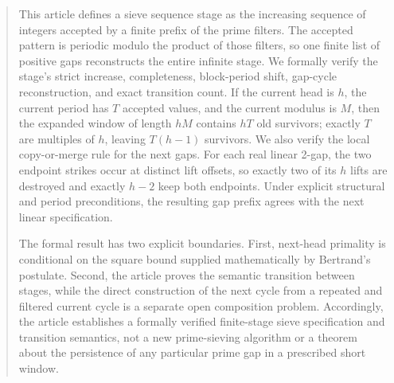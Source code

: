 \begin{abstract}
This article defines a sieve sequence stage as the increasing sequence of
integers accepted by a finite prefix of the prime filters. The accepted
pattern is periodic modulo the product of those filters, so one finite
list of positive gaps reconstructs the entire infinite stage. We formally
verify the stage's strict increase, completeness, block-period shift,
gap-cycle reconstruction, and exact transition count. If the current head
is $h$, the current period has $T$ accepted values, and the current
modulus is $M$, then the expanded window of length $hM$ contains $hT$ old
survivors; exactly $T$ are multiples of $h$, leaving $T(h-1)$ survivors.
We also verify the local copy-or-merge rule for the next gaps. For each
real linear 2-gap, the two endpoint strikes occur at distinct lift
offsets, so exactly two of its $h$ lifts are destroyed and exactly $h-2$
keep both endpoints. Under explicit structural and period preconditions,
the resulting gap prefix agrees with the next linear specification.

The formal result has two explicit boundaries. First, next-head
primality is conditional on the square bound supplied mathematically by
Bertrand's postulate. Second, the article proves the semantic transition
between stages, while the direct construction of the next cycle from a
repeated and filtered current cycle is a separate open composition
problem. Accordingly, the article establishes a formally verified
finite-stage sieve specification and transition semantics, not a new
prime-sieving algorithm or a theorem about the persistence of any
particular prime gap in a prescribed short window.
\end{abstract}
